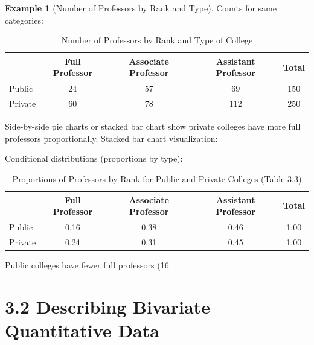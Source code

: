 \documentclass{article}
\theoremstyle{definition}
\newtheorem{example}{Example}
\begin{document}
	\begin{example}[Number of Professors by Rank and Type]
		Counts for same categories:
		\begin{table}[ht]
			\centering
			\begin{tabular}{lcccc}
				\toprule
				& Full Professor & Associate Professor & Assistant Professor & Total \\
				\midrule
				Public & 24 & 57 & 69 & 150 \\
				Private & 60 & 78 & 112 & 250 \\
				\bottomrule
			\end{tabular}
			\caption{Number of Professors by Rank and Type of College}
		\end{table}
		Side-by-side pie charts or stacked bar chart show private colleges have more full professors proportionally.
		Stacked bar chart visualization:
		Conditional distributions (proportions by type):
		\begin{table}[ht]
			\centering
			\begin{tabular}{lcccc}
				\toprule
				& Full Professor & Associate Professor & Assistant Professor & Total \\
				\midrule
				Public & 0.16 & 0.38 & 0.46 & 1.00 \\
				Private & 0.24 & 0.31 & 0.45 & 1.00 \\
				\bottomrule
			\end{tabular}
			\caption{Proportions of Professors by Rank for Public and Private Colleges (Table 3.3)}
		\end{table}
		Public colleges have fewer full professors (16%
	\end{example}
	\section{3.2 Describing Bivariate Quantitative Data}
\end{document}
